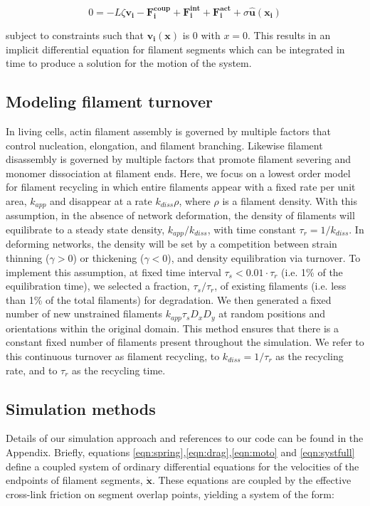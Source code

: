 \documentclass[10pt,letterpaper]{article}
\begin{document}
\begin{equation}
\label{eqn:systfull}
0=-L\zeta\mathbf{ v_i} -\mathbf{F^{coup}_i}+ \mathbf{F^{int}_i}+\mathbf{F^{act}_i} + \sigma\mathbf{\hat{u}(x_i)}
\end{equation}

subject to constraints such that $\mathbf{v_i(x)}$ is 0 with $x=0$.  This results in an implicit differential equation for filament segments which can be integrated in time to produce a solution for the motion of the system.


\subsection*{Modeling filament turnover}

In living cells, actin filament assembly is governed by multiple factors that control nucleation, elongation, and filament branching. Likewise filament disassembly is governed by multiple factors that promote filament severing and monomer dissociation at filament ends. Here, we focus on a lowest order model for filament recycling in which entire filaments appear with a fixed rate per unit area, $k_{app}$ and disappear at a rate $k_{diss}\rho$, where $\rho$ is a filament density. With this assumption, in the absence of network deformation, the density of filaments will equilibrate to a steady state density, $k_{app}/k_{diss}$, with time constant $\tau_r = 1/k_{diss}$.   In deforming networks, the density will be set by a competition between strain thinning ($\gamma>0$) or thickening ($\gamma<0$), and density equilibration via turnover. To implement this assumption, at fixed time interval $\tau_s < 0.01\cdot\tau_r$ (i.e. 1\% of the equilibration time), we selected a fraction, $\tau_s/\tau_r$, of existing filaments (i.e. less than 1\% of the total filaments) for degradation. We then generated a fixed number of new unstrained filaments $k_{app}\tau_sD_xD_y$ at random positions and orientations within the original domain.   This method ensures that there is a constant fixed number of filaments present throughout the simulation. We refer to this continuous turnover as filament recycling, to $k_{diss}=1/\tau_r$ as the recycling rate, and to $\tau_r$ as the recycling time.


\subsection*{Simulation methods}

Details of our simulation approach and references to our code can be found in the Appendix. Briefly, equations \ref{eqn:spring},\ref{eqn:drag},\ref{eqn:moto} and \ref{eqn:systfull} define a coupled system of ordinary differential equations for the velocities of the endpoints of filament segments, $\mathbf{\dot{x}}$.  These equations are coupled by the effective cross-link friction on segment overlap points, yielding a system of the form:
\end{document}
